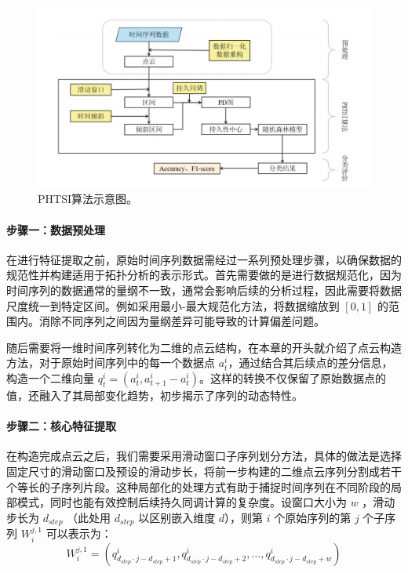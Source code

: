 \begin{figure}[thbp!]
    \centering
    \includegraphics[width=1.0\textwidth]{figure/严银凯示意图.png}
    \caption{PHTSI算法示意图。}
    \label{fig:phtsi_algorithm}
\end{figure}

\paragraph*{步骤一：数据预处理}
在进行特征提取之前，原始时间序列数据需经过一系列预处理步骤，以确保数据的规范性并构建适用于拓扑分析的表示形式。首先需要做的是进行数据规范化，因为时间序列的数据通常的量纲不一致，通常会影响后续的分析过程，因此需要将数据尺度统一到特定区间。例如采用最小-最大规范化方法，将数据缩放到 $[0, 1]$ 的范围内。消除不同序列之间因为量纲差异可能导致的计算偏差问题。

随后需要将一维时间序列转化为二维的点云结构，在本章的开头就介绍了点云构造方法，对于原始时间序列中的每一个数据点 $a_t^i$，通过结合其后续点的差分信息，构造一个二维向量 $q_t^i = (a_t^i, a_{t+1}^i - a_t^i)$。这样的转换不仅保留了原始数据点的值，还融入了其局部变化趋势，初步揭示了序列的动态特性。
%
\paragraph*{步骤二：核心特征提取}
在构造完成点云之后，我们需要采用滑动窗口子序列划分方法，具体的做法是选择固定尺寸的滑动窗口及预设的滑动步长，将前一步构建的二维点云序列分割成若干个等长的子序列片段。这种局部化的处理方式有助于捕捉时间序列在不同阶段的局部模式，同时也能有效控制后续持久同调计算的复杂度。设窗口大小为 $w$ ，滑动步长为 $d_{step}$ （此处用 $d_{step}$ 以区别嵌入维度 $d$），则第 $i$ 个原始序列的第 $j$ 个子序列 $W_i^{j, 1}$ 可以表示为：
\begin{equation}
    W_i^{j, 1}=\left(q_{d_{step} \cdot j-d_{step}+1}^i, q_{d_{step} \cdot j-d_{step}+2}^i, \ldots, q_{d_{step} \cdot j-d_{step}+w}^i\right)
\end{equation}

